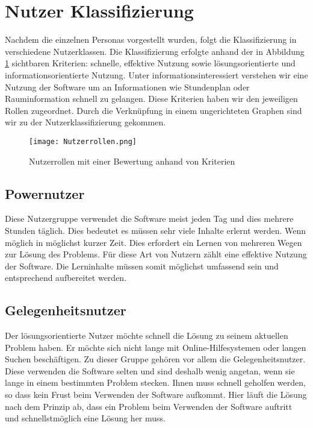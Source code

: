\section{Nutzer Klassifizierung}
Nachdem die einzelnen Personas vorgestellt wurden, folgt die Klassifizierung in verschiedene Nutzerklassen. Die Klassifizierung erfolgte anhand der in Abbildung \ref{img1:userRoles} sichtbaren Kriterien: schnelle, effektive Nutzung sowie lösungsorientierte und informationsorientierte Nutzung. Unter informationsinteressiert verstehen wir eine Nutzung der Software um an Informationen wie Stundenplan oder Rauminformation schnell zu gelangen. Diese Kriterien haben wir den jeweiligen Rollen zugeordnet. Durch die Verknüpfung in einem ungerichteten Graphen sind wir zu der Nutzerklassifizierung gekommen.
\begin{figure}[ht]
\begin{center}
\texttt{[image: Nutzerrollen.png]}
\caption{Nutzerrollen mit einer Bewertung anhand von Kriterien}
\label{img1:userRoles}
\end{center}
\end{figure} 
\subsection{Powernutzer}
Diese Nutzergruppe verwendet die Software meist jeden Tag und dies mehrere Stunden täglich. Dies bedeutet es müssen sehr viele Inhalte erlernt werden. Wenn möglich in möglichst kurzer Zeit. Dies erfordert ein Lernen von mehreren Wegen zur Lösung des Problems. Für diese Art von Nutzern zählt eine effektive Nutzung der Software. Die Lerninhalte müssen somit möglichst umfassend sein und entsprechend aufbereitet werden. 

\subsection{Gelegenheitsnutzer}
Der lösungsorientierte Nutzer möchte schnell die Lösung zu seinem aktuellen Problem haben. Er möchte sich nicht lange mit Online-Hilfesystemen oder langen Suchen beschäftigen. Zu dieser Gruppe gehören vor allem die Gelegenheitsnutzer. Diese verwenden die Software selten und sind deshalb wenig angetan, wenn sie lange in einem bestimmten Problem stecken. Ihnen muss schnell geholfen werden, so dass kein Frust beim Verwenden der Software aufkommt. Hier läuft die Lösung nach dem Prinzip ab, dass ein Problem beim Verwenden der Software auftritt und schnellstmöglich eine Lösung her muss. 

